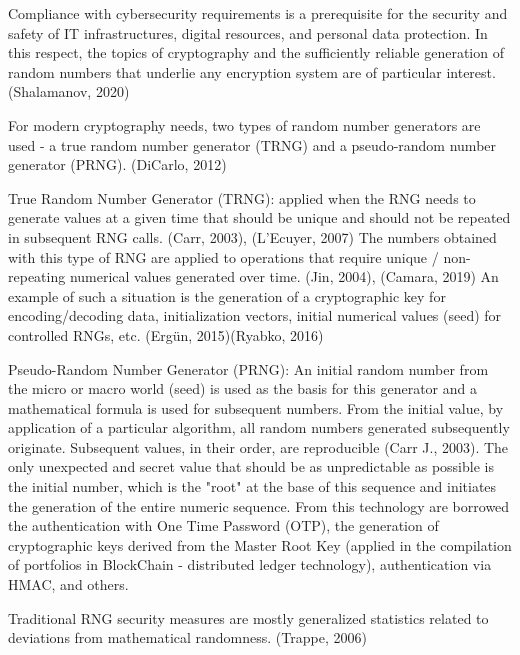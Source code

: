 \documentclass[runningheads]{llncs}
\begin{document}
Compliance with cybersecurity requirements is a prerequisite for the security and safety of IT infrastructures, digital resources, and personal data protection. In this respect, the topics of cryptography and the sufficiently reliable generation of random numbers that underlie any encryption system are of particular interest. (Shalamanov, 2020)

For modern cryptography needs, two types of random number generators are used - a true random number generator (TRNG) and a pseudo-random number generator (PRNG). (DiCarlo, 2012) 

True Random Number Generator (TRNG): applied when the RNG needs to generate values at a given time that should be unique and should not be repeated in subsequent RNG calls. (Carr, 2003), (L'Ecuyer, 2007) The numbers obtained with this type of RNG are applied to operations that require unique / non-repeating numerical values generated over time. (Jin, 2004), (Camara, 2019) An example of such a situation is the generation of a cryptographic key for encoding/decoding data, initialization vectors, initial numerical values (seed) for controlled RNGs, etc. (Ergün, 2015)(Ryabko, 2016)

Pseudo-Random Number Generator (PRNG): An initial random number from the micro or macro world (seed) is used as the basis for this generator and a mathematical formula is used for subsequent numbers. From the initial value, by application of a particular algorithm, all random numbers generated subsequently originate. Subsequent values, in their order, are reproducible (Carr J., 2003). The only unexpected and secret value that should be as unpredictable as possible is the initial number, which is the "root" at the base of this sequence and initiates the generation of the entire numeric sequence. From this technology are borrowed the authentication with One Time Password (OTP), the generation of cryptographic keys derived from the Master Root Key (applied in the compilation of portfolios in BlockChain - distributed ledger technology), authentication via HMAC, and others.

Traditional RNG security measures are mostly generalized statistics related to deviations from mathematical randomness. (Trappe, 2006)
\end{document}

